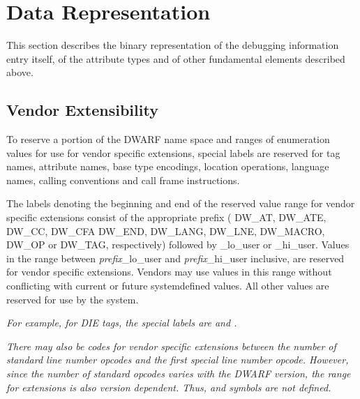 \chapter{Data Representation}
\label{datarep:datarepresentation}

This section describes the binary representation of the
debugging information entry itself, of the attribute types
and of other fundamental elements described above.

\section{Vendor Extensibility}
\label{datarep:vendorextensibility}

To 
reserve a portion of the DWARF name space and ranges of
enumeration values for use for vendor specific extensions,
special labels are reserved for tag names, attribute names,
base type encodings, location operations, language names,
calling conventions and call frame instructions.

The labels denoting the beginning and end of the reserved
\hypertarget{chap:DWXXXlohiuser}{}
value range for vendor specific extensions consist of the
appropriate prefix 
(\DWATlouserMARK{}\DWAThiuserMARK{}	DW\_AT,
\DWATElouserMARK{}\DWATEhiuserMARK{}	DW\_ATE, 
\DWCClouserMARK{}\DWCChiuserMARK{}	DW\_CC,
\DWCFAlouserMARK{}\DWCFAhiuserMARK{}	DW\_CFA 
\DWENDlouserMARK{}\DWENDhiuserMARK{}	DW\_END, 
\DWLANGlouserMARK{}\DWLANGhiuserMARK{}  DW\_LANG, 
\DWLNElouserMARK{}\DWLNEhiuserMARK{}	DW\_LNE, 
\DWMACROlouserMARK{}\DWMACROhiuserMARK{}DW\_MACRO,
\DWOPlouserMARK{}\DWOPhiuserMARK{}	DW\_OP or
\DWTAGlouserMARK{}\DWTAGhiuserMARK{}	DW\_TAG, 
respectively) followed by
\_lo\_user or \_hi\_user. 
Values in the  range between \textit{prefix}\_lo\_user 
and \textit{prefix}\_hi\_user inclusive,
are reserved for vendor specific extensions. Vendors may
use values in this range without conflicting with current or
future system\dash defined values. All other values are reserved
for use by the system.

\textit{For example, for DIE tags, the special
labels are \DWTAGlouserNAME{} and \DWTAGhiuserNAME.}

\textit{There may also be codes for vendor specific extensions
between the number of standard line number opcodes and
the first special line number opcode. However, since the
number of standard opcodes varies with the DWARF version,
the range for extensions is also version dependent. Thus,
\DWLNSlouserTARG{} and 
\DWLNShiuserTARG{} symbols are not defined.
}

